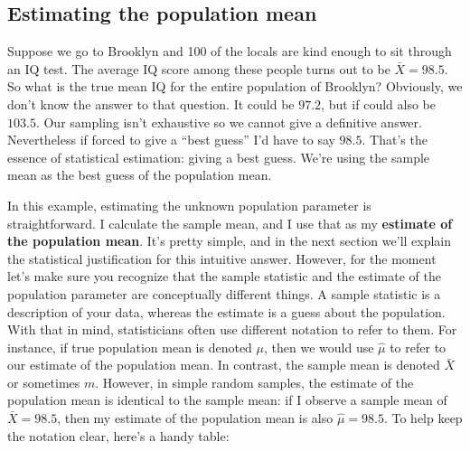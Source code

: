 \documentclass[]{book}
\begin{document}
\hypertarget{estimating-the-population-mean}{%
\subsection{Estimating the population mean}\label{estimating-the-population-mean}}

Suppose we go to Brooklyn and 100 of the locals are kind enough to sit through an IQ test. The average IQ score among these people turns out to be \(\bar{X}=98.5\). So what is the true mean IQ for the entire population of Brooklyn? Obviously, we don't know the answer to that question. It could be \(97.2\), but if could also be \(103.5\). Our sampling isn't exhaustive so we cannot give a definitive answer. Nevertheless if forced to give a ``best guess'' I'd have to say \(98.5\). That's the essence of statistical estimation: giving a best guess. We're using the sample mean as the best guess of the population mean.

In this example, estimating the unknown population parameter is straightforward. I calculate the sample mean, and I use that as my \textbf{estimate of the population mean}. It's pretty simple, and in the next section we'll explain the statistical justification for this intuitive answer. However, for the moment let's make sure you recognize that the sample statistic and the estimate of the population parameter are conceptually different things. A sample statistic is a description of your data, whereas the estimate is a guess about the population. With that in mind, statisticians often use different notation to refer to them. For instance, if true population mean is denoted \(\mu\), then we would use \(\hat\mu\) to refer to our estimate of the population mean. In contrast, the sample mean is denoted \(\bar{X}\) or sometimes \(m\). However, in simple random samples, the estimate of the population mean is identical to the sample mean: if I observe a sample mean of \(\bar{X} = 98.5\), then my estimate of the population mean is also \(\hat\mu = 98.5\). To help keep the notation clear, here's a handy table:
\end{document}
